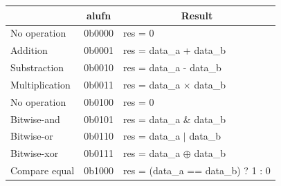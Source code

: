 \begin{table}[ht]
    \centering
    \begin{tabular}{|l|l|l|}
    \hline
    \rowcolor[HTML]{DAE8FC} 
    \multicolumn{1}{|c|}{\cellcolor[HTML]{DAE8FC}\textbf{Operation}} & \multicolumn{1}{c|}{\cellcolor[HTML]{DAE8FC}\textbf{alufn}} & \multicolumn{1}{c|}{\cellcolor[HTML]{DAE8FC}\textbf{Result}}   \\ \hline
    No operation                                                     & 0b0000                                                      & res = 0                                                        \\ \hline
    Addition                                                         & 0b0001                                                      & res = data\_a + data\_b                                        \\ \hline
    Substraction                                                     & 0b0010                                                      & res = data\_a - data\_b                                        \\ \hline
    Multiplication                                                   & 0b0011                                                      & res = data\_a $\times$ data\_b                    \\ \hline
    No operation                                                     & 0b0100                                                      & res = 0                                                        \\ \hline
    Bitwise-and                                                      & 0b0101                                                      & res = data\_a \& data\_b                                       \\ \hline
    Bitwise-or                                                       & 0b0110                                                      & res = data\_a $|$ data\_b                                        \\ \hline
    Bitwise-xor                                                      & 0b0111                                                      & res = data\_a $\oplus$ data\_b                         \\ \hline
    Compare equal                                                    & 0b1000                                                      & res = (data\_a == data\_b) ? 1 : 0                             \\ \hline

\end{tabular}
\end{table}
